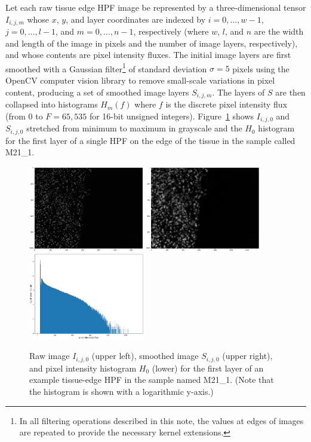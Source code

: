 \documentclass[letterpaper,11pt]{article}
\newcommand{\reffig}[1]{Figure~\ref{#1}}
\begin{document}
Let each raw tissue edge HPF image be represented by a three-dimensional tensor $I_{i,j,m}$ whose $x$, $y$, and layer coordinates are indexed by $i=0,\ldots,w-1$, $j=0,\ldots,l-1$, and $m=0,\ldots,n-1$, respectively (where $w$, $l$, and $n$ are the width and length of the image in pixels and the number of image layers, respectively), and whose contents are pixel intensity fluxes. The initial image layers are first smoothed with a Gaussian filter\footnote{In all filtering operations described in this note, the values at edges of images are repeated to provide the necessary kernel extensions.} of standard deviation $\sigma=5$ pixels using the OpenCV computer vision library \cite{opencv_library} to remove small-scale variations in pixel content, producing a set of smoothed image layers $S_{i,j,m}$. The layers of $S$ are then collapsed into histograms $H_{m}(f)$ where $f$ is the discrete pixel intensity flux (from 0 to $F=65,535$ for 16-bit unsigned integers). \reffig{fig:raw_to_smoothed_to_histogram} shows $I_{i,j,0}$ and $S_{i,j,0}$ stretched from minimum to maximum in grayscale and the $H_{0}$ histogram for the first layer of a single HPF on the edge of the tissue in the sample called M21\_1. 

\begin{figure}[!ht]
\centering
\includegraphics[width=0.45\textwidth]{images/masking/example_raw_image}
\includegraphics[width=0.45\textwidth]{images/masking/example_smoothed_image}
\includegraphics[width=0.45\textwidth]{images/masking/example_histogram}
\caption{\footnotesize Raw image $I_{i,j,0}$ (upper left), smoothed image $S_{i,j,0}$ (upper right), and pixel intensity histogram $H_{0}$ (lower) for the first layer of an example tissue-edge HPF in the sample named M21\_1. (Note that the histogram is shown with a logarithmic y-axis.)}
\label{fig:raw_to_smoothed_to_histogram}
\end{figure}
\end{document}
